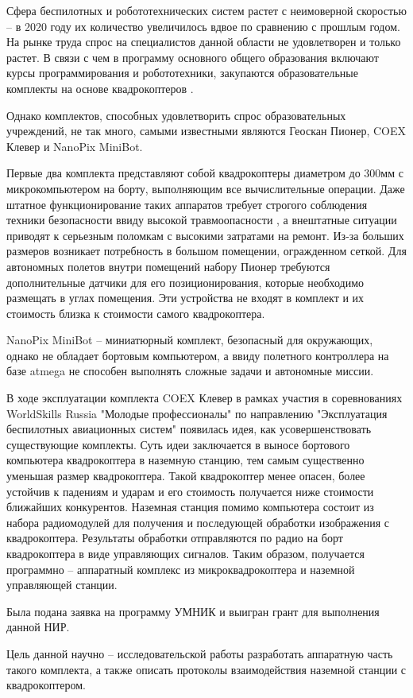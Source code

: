 Сфера беспилотных и робототехнических систем растет с неимоверной скоростью -- в 2020 году их количество увеличилось вдвое по сравнению с прошлым годом. На рынке труда спрос на специалистов данной области не удовлетворен и только растет. В связи с чем в программу основного общего образования включают курсы программирования и робототехники, закупаются образовательные комплекты на основе квадрокоптеров \cite{minobr}.

Однако комплектов, способных удовлетворить спрос образовательных учреждений, не так много, самыми известными являются Геоскан Пионер, COEX Клевер и NanoPix MiniBot.

Первые два комплекта представляют собой квадрокоптеры диаметром до 300мм с микрокомпьютером на борту, выполняющим все вычислительные операции. Даже штатное функционирование таких аппаратов требует строгого соблюдения техники безопасности ввиду высокой травмоопасности , а внештатные ситуации приводят к серьезным поломкам с высокими затратами на ремонт. Из-за больших размеров возникает потребность в большом помещении, огражденном сеткой. Для автономных полетов внутри помещений набору Пионер требуются дополнительные датчики для его позиционирования, которые необходимо размещать в углах помещения. Эти устройства не входят в комплект и их стоимость близка к стоимости самого квадрокоптера.

NanoPix MiniBot -- миниатюрный комплект, безопасный для окружающих, однако не обладает бортовым компьютером, а ввиду полетного контроллера на базе atmega не способен выполнять сложные задачи и автономные миссии.

В ходе эксплуатации комплекта COEX Клевер в рамках участия в соревнованиях WorldSkills Russia "Молодые профессионалы" по направлению "Эксплуатация беспилотных авиационных систем" появилась идея, как усовершенствовать существующие комплекты.
Суть идеи заключается в выносе бортового компьютера квадрокоптера в наземную станцию, тем самым существенно уменьшая размер квадрокоптера. Такой квадрокоптер менее опасен, более устойчив к падениям и ударам и его стоимость получается ниже стоимости ближайших конкурентов. Наземная станция помимо компьютера состоит из набора радиомодулей для получения и последующей обработки изображения с квадрокоптера. Результаты обработки отправляются по радио на борт квадрокоптера в виде управляющих сигналов. Таким образом, получается программно -- аппаратный комплекс из микроквадрокоптера и наземной управляющей станции.

Была подана заявка на программу УМНИК и выигран грант для выполнения данной НИР.

Цель данной научно -- исследовательской работы разработать аппаратную часть такого комплекта, а также описать протоколы взаимодействия наземной станции с квадрокоптером.
